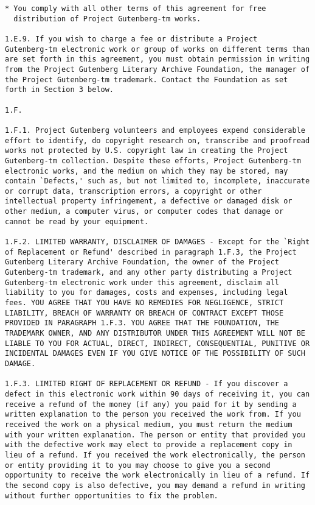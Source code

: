 \documentclass[oneside]{book}
\begin{document}
\begin{verbatim}
* You comply with all other terms of this agreement for free
  distribution of Project Gutenberg-tm works.

1.E.9. If you wish to charge a fee or distribute a Project
Gutenberg-tm electronic work or group of works on different terms than
are set forth in this agreement, you must obtain permission in writing
from the Project Gutenberg Literary Archive Foundation, the manager of
the Project Gutenberg-tm trademark. Contact the Foundation as set
forth in Section 3 below.

1.F.

1.F.1. Project Gutenberg volunteers and employees expend considerable
effort to identify, do copyright research on, transcribe and proofread
works not protected by U.S. copyright law in creating the Project
Gutenberg-tm collection. Despite these efforts, Project Gutenberg-tm
electronic works, and the medium on which they may be stored, may
contain `Defects,' such as, but not limited to, incomplete, inaccurate
or corrupt data, transcription errors, a copyright or other
intellectual property infringement, a defective or damaged disk or
other medium, a computer virus, or computer codes that damage or
cannot be read by your equipment.

1.F.2. LIMITED WARRANTY, DISCLAIMER OF DAMAGES - Except for the `Right
of Replacement or Refund' described in paragraph 1.F.3, the Project
Gutenberg Literary Archive Foundation, the owner of the Project
Gutenberg-tm trademark, and any other party distributing a Project
Gutenberg-tm electronic work under this agreement, disclaim all
liability to you for damages, costs and expenses, including legal
fees. YOU AGREE THAT YOU HAVE NO REMEDIES FOR NEGLIGENCE, STRICT
LIABILITY, BREACH OF WARRANTY OR BREACH OF CONTRACT EXCEPT THOSE
PROVIDED IN PARAGRAPH 1.F.3. YOU AGREE THAT THE FOUNDATION, THE
TRADEMARK OWNER, AND ANY DISTRIBUTOR UNDER THIS AGREEMENT WILL NOT BE
LIABLE TO YOU FOR ACTUAL, DIRECT, INDIRECT, CONSEQUENTIAL, PUNITIVE OR
INCIDENTAL DAMAGES EVEN IF YOU GIVE NOTICE OF THE POSSIBILITY OF SUCH
DAMAGE.

1.F.3. LIMITED RIGHT OF REPLACEMENT OR REFUND - If you discover a
defect in this electronic work within 90 days of receiving it, you can
receive a refund of the money (if any) you paid for it by sending a
written explanation to the person you received the work from. If you
received the work on a physical medium, you must return the medium
with your written explanation. The person or entity that provided you
with the defective work may elect to provide a replacement copy in
lieu of a refund. If you received the work electronically, the person
or entity providing it to you may choose to give you a second
opportunity to receive the work electronically in lieu of a refund. If
the second copy is also defective, you may demand a refund in writing
without further opportunities to fix the problem.


\end{verbatim}
\end{document}
